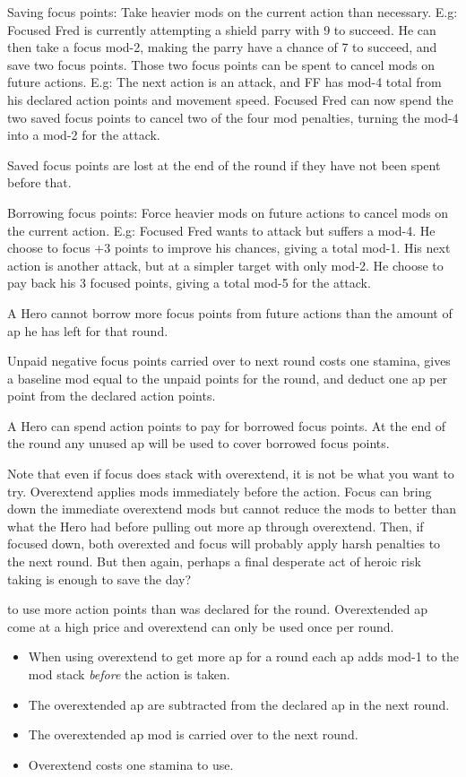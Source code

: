 Saving focus points: Take heavier mods on the current action than necessary.
E.g: Focused Fred is currently attempting a shield parry with 9 to succeed. He can then take a focus mod-2, making the parry have a chance of 7 to succeed, and save two focus points. Those two focus points can be spent to cancel mods on future actions. E.g: The next action is an attack, and FF has mod-4 total from his declared action points and movement speed. Focused Fred can now spend the two saved focus points to cancel two of the four mod penalties, turning the mod-4 into a mod-2 for the attack.

Saved focus points are lost at the end of the round if they have not been spent before that.

Borrowing focus points: Force heavier mods on future actions to cancel mods on the current action. E.g: Focused Fred wants to attack but suffers a mod-4. He choose to focus +3 points to improve his chances, giving a total mod-1. His next action is another attack, but at a simpler target with only mod-2. He choose to pay back his 3 focused points, giving a total mod-5 for the attack.

A Hero cannot borrow more focus points from future actions than the amount of ap he has left for that round.

Unpaid negative focus points carried over to next round costs one stamina, gives a baseline mod equal to the unpaid points for the round, and deduct one ap per point from the declared action points.

A Hero can spend action points to pay for borrowed focus points. At the end of the round any unused ap will be used to cover borrowed focus points.

Note that even if focus does stack with overextend, it is not be what you want to try. Overextend applies mods immediately before the action. Focus can bring down the immediate overextend mods but cannot reduce the mods to better than what the Hero had before pulling out more ap through overextend. Then, if focused down, both overexted and focus will probably apply harsh penalties to the next round. But then again, perhaps a final desperate act of heroic risk taking is enough to save the day?


 to use more action points than was declared for the round. Overextended ap come at a high price and overextend can only be used once per round.
\begin{itemize}
    \item When using overextend to get more ap for a round each ap adds mod-1 to the mod stack \emph{before} the action is taken.
    \item The overextended ap are subtracted from the declared ap in the next round.
    \item The overextended ap mod is carried over to the next round.
    \item Overextend costs one stamina to use.
\end{itemize}

